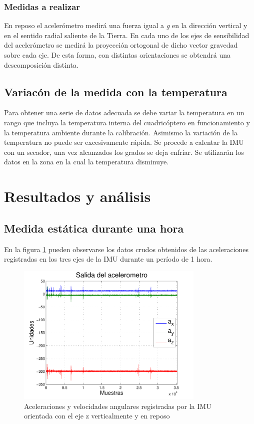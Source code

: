\documentclass[main]{subfiles}
\begin{document}
\subsubsection*{Medidas a realizar}
En reposo el acelerómetro medirá una fuerza igual a \textit{g} en la dirección vertical y en el sentido radial saliente de la Tierra. En cada uno de los ejes de sensibilidad del acelerómetro se medirá la proyección ortogonal de dicho vector gravedad sobre cada eje. De esta forma, con distintas orientaciones se obtendrá una descomposición distinta.

\subsection{Variac\'on de la medida con la temperatura}
Para obtener una serie de datos adecuada se debe variar la temperatura en un rango que incluya la temperatura interna del cuadric\'optero en funcionamiento y la temperatura ambiente durante la calibraci\'on. Asimismo la variaci\'on de la temperatura no puede ser excesivamente r\'apida. Se procede a calentar la IMU con un secador, una vez alcanzados los %
grados se deja enfriar. Se utilizar\'an los datos en la zona en la cual la temperatura disminuye. 

\section{Resultados y análisis}
\subsection{Medida estática durante una hora}

En la figura \ref{fig:1hora} pueden observarse los datos crudos obtenidos de las aceleraciones registradas en los tres ejes de la IMU durante un período de 1 hora.

\begin{figure}[h!]
  \begin{center}
    \includegraphics[width=0.8\textwidth]{./pics_acc/1hora.pdf}
  \end{center}
  \vspace{-20pt}
  \caption{Aceleraciones y velocidades angulares registradas por la IMU orientada con el eje z verticalmente y en reposo}
  \label{fig:1hora}
\end{figure}
\end{document}
